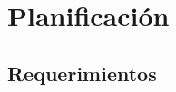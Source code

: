 \chapter{Planificación}
\label{chap:planificacion}


%
%
% 
%
%
% 
%
%
%
% 





\section{Requerimientos}
\label{sec:requerimientos}

